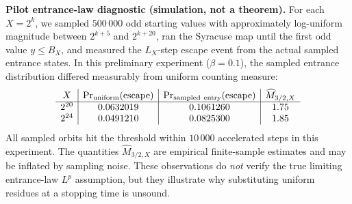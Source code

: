 \documentclass[11pt]{amsart}
\theoremstyle{remark}\newtheorem{remark}{Remark}
\begin{document}
\noindent\textbf{Pilot entrance-law diagnostic (simulation, not a theorem).}
For each $X=2^k$, we sampled $500\,000$ odd starting values with approximately log-uniform magnitude between $2^{k+5}$ and $2^{k+20}$, ran the Syracuse map until the first odd value $y\le B_X$, and measured the $L_X$-step escape event from the actual sampled entrance states.  In this preliminary experiment ($\beta=0.1$), the sampled entrance distribution differed measurably from uniform counting measure:
\[
\begin{array}{c|c|c|c}
 X&\Pr_{\rm uniform}(\mathrm{escape})&\Pr_{\rm sampled\ entry}(\mathrm{escape})&\widehat M_{3/2,X}\\\hline
 2^{20}&0.0632019&0.1061260&1.75\\
 2^{24}&0.0491210&0.0825300&1.85
\end{array}
\]
All sampled orbits hit the threshold within $10\,000$ accelerated steps in this experiment.  The quantities $\widehat M_{3/2,X}$ are empirical finite-sample estimates and may be inflated by sampling noise.  These observations do \emph{not} verify the true limiting entrance-law $L^p$ assumption, but they illustrate why substituting uniform residues at a stopping time is unsound.
\end{document}
